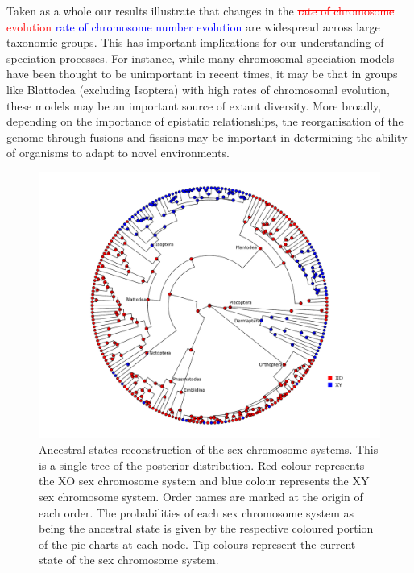 \documentclass[]{rsos}%
\begin{document}
Taken as a whole our results illustrate that changes in the
\textcolor{red}{\st{rate of chromosome evolution}} \textcolor{blue}{rate of chromosome number evolution} are widespread across large taxonomic groups.
This has important implications for our understanding of speciation processes.
For instance, while many chromosomal speciation models \cite{baker1986, white} have been thought to be unimportant in recent times, it may be that in groups like Blattodea (excluding Isoptera) with high rates of chromosomal evolution, these models may be an important source of extant diversity.
More broadly, depending on the importance of epistatic relationships, the reorganisation of the genome through fusions and fissions may be important in determining the ability of organisms to adapt to novel environments.

\newpage
\begin{figure}[h!]
\centering \includegraphics[width=1\textwidth]{sex_asr_plot.pdf}
\caption{Ancestral states reconstruction of the sex chromosome systems. 
This is a single tree of the posterior distribution. 
Red colour represents the XO sex chromosome system and blue colour represents the XY sex chromosome system. Order names are marked at the origin of each order. 
The probabilities of each sex chromosome system as being the ancestral state is given by the respective coloured portion of the pie charts at each node. 
Tip colours represent the current state of the sex chromosome system.}
\label{fig:sex.asr.plot}
\end{figure}
\end{document}
